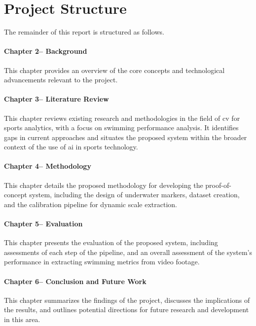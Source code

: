 \section{Project Structure}
The remainder of this report is structured as follows.

\paragraph{Chapter 2-- Background}
This chapter provides an overview of the core concepts and technological advancements relevant to the project.

\paragraph{Chapter 3-- Literature Review}
This chapter reviews existing research and methodologies in the field of \gls{cv} for sports analytics, with a focus on swimming performance analysis. It identifies gaps in current approaches and situates the proposed system within the broader context of the use of \gls{ai} in sports technology.

\paragraph{Chapter 4-- Methodology}
This chapter details the proposed methodology for developing the proof-of-concept system, including the design of underwater markers, dataset creation, and the calibration pipeline for dynamic scale extraction.

\paragraph{Chapter 5-- Evaluation}
This chapter presents the evaluation of the proposed system, including assessments of each step of the pipeline, and an overall assessment of the system's performance in extracting swimming metrics from video footage.

\paragraph{Chapter 6-- Conclusion and Future Work}
This chapter summarizes the findings of the project, discusses the implications of the results, and outlines potential directions for future research and development in this area.